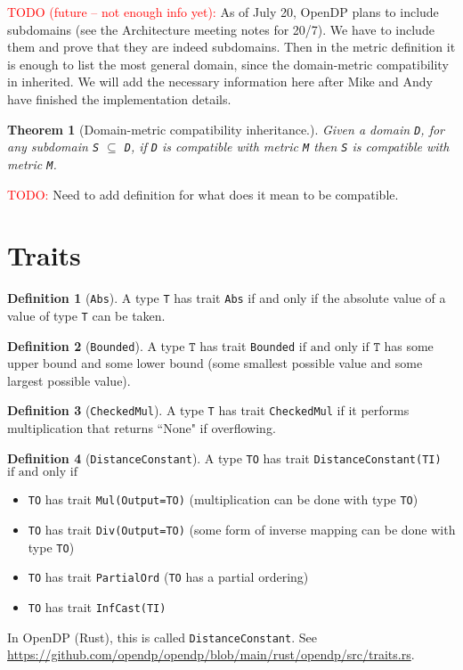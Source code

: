 \documentclass[11pt,a4paper]{article}
\newtheorem{theorem}{Theorem}[section]
\theoremstyle{definition}
\newtheorem{definition}{Definition}[section]
\newcommand{\silvia}[1]{{ {\color{blue}{(silvia)~#1}}}}
\newcommand{\inOpenDPRust}[2]{In OpenDP (Rust), this is called \texttt{#1}. See \url{#2}.}
\newcommand{\T}{\texttt{T}}
\newcommand{\todo}{{\textcolor{red}{TODO: }}}
\newcommand{\todonei}{{\textcolor{red}{TODO (future -- not enough info yet): }}}
\newcommand{\iffText}{\text{if and only if}}
\begin{document}
\todonei{As of July 20, OpenDP plans to include subdomains (see the Architecture meeting notes for 20/7). We have to include them and prove that they are indeed subdomains. Then in the metric definition it is enough to list the most general domain, since the domain-metric compatibility in inherited. We will add the necessary information here after Mike and Andy have finished the implementation details.}

\begin{theorem}[Domain-metric compatibility inheritance.]
    Given a domain \texttt{D}, for any subdomain \texttt{S} $\subseteq$ \texttt{D}, if \texttt{D} is compatible with metric \texttt{M} then \texttt{S} is compatible with metric \texttt{M}.
\end{theorem}

\silvia{Since it is a theorem, should it be moved to the proof defs doc?}

\todo{Need to add definition for what does it mean to be compatible.}

\section{Traits}

\begin{definition}[\texttt{Abs}]
    A type \texttt{T} has trait \texttt{Abs} if and only if the absolute value of a value of type \texttt{T} can be taken.
\end{definition}

\begin{definition}[\texttt{Bounded}]
    A type $\T$ has trait \texttt{Bounded} $\iffText$ $\T$ has some upper bound and some lower bound (some smallest possible value and some largest possible value).
\end{definition}

\begin{definition}[\texttt{CheckedMul}]
    A type \texttt{T} has trait \texttt{CheckedMul} if it performs multiplication that returns ``None" if overflowing.
\end{definition}

\begin{definition}[\texttt{DistanceConstant}]
    A type \texttt{TO} has trait \texttt{DistanceConstant(TI)} $\iffText$
    \begin{itemize}
        \item \texttt{TO} has trait \texttt{Mul(Output=TO)} (multiplication can be done with type \texttt{TO})
        \item \texttt{TO} has trait \texttt{Div(Output=TO)} (some form of inverse mapping can be done with type \texttt{TO})
        \item \texttt{TO} has trait \texttt{PartialOrd} (\texttt{TO} has a partial ordering)
        \item \texttt{TO} has trait \texttt{InfCast(TI)}
    \end{itemize}
    \inOpenDPRust{DistanceConstant}{https://github.com/opendp/opendp/blob/main/rust/opendp/src/traits.rs}
\end{definition}
\end{document}
